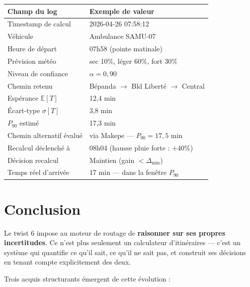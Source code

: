 \documentclass[12pt,a4paper]{article}
\theoremstyle{definition}
\theoremstyle{remark}
\begin{document}
\begin{center}
\begin{tabular}{ll}
  \toprule
  \textbf{Champ du log} & \textbf{Exemple de valeur} \\
  \midrule
  Timestamp de calcul       & 2026-04-26 07:58:12 \\
  Véhicule                  & Ambulance SAMU-07 \\
  Heure de départ           & 07h58 (pointe matinale) \\
  Prévision météo           & sec 10\%, léger 60\%, fort 30\% \\
  Niveau de confiance       & $\alpha = 0{,}90$ \\
  Chemin retenu             & Bépanda $\to$ Bld Liberté $\to$ Central \\
  Espérance $\mathbb{E}[T]$ & 12,4 min \\
  Écart-type $\sigma[T]$    & 3,8 min \\
  $P_{90}$ estimé           & 17,3 min \\
  Chemin alternatif évalué  & via Makepe — $P_{90} = 17{,}5$ min \\
  Recalcul déclenché à      & 08h04 (hausse pluie forte : $+40\%$) \\
  Décision recalcul         & Maintien (gain $<\Delta_{\min}$) \\
  Temps réel d'arrivée      & 17 min — dans la fenêtre $P_{90}$ \\
  \bottomrule
\end{tabular}
\end{center}

\newpage

\section*{Conclusion}

Le twist 6 impose au moteur de routage de \textbf{raisonner sur ses
propres incertitudes}. Ce n'est plus seulement un calculateur
d'itinéraires — c'est un système qui quantifie ce qu'il sait, ce qu'il
ne sait pas, et construit ses décisions en tenant compte explicitement
des deux.

\medskip
Trois acquis structurants émergent de cette évolution :
\end{document}
